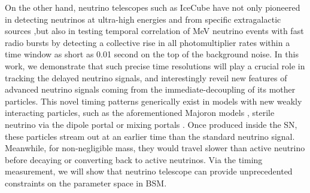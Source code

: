 On the other hand, neutrino telescopes such as IceCube have not only pioneered in detecting neutrinos at ultra-high energies \cite{IceCube:2014stg,IceCube:2018cha} and from specific extragalactic sources \cite{IceCube:2023ame,IceCube:2022der},but also in testing temporal correlation of MeV neutrino events with fast radio bursts \cite{IceCube:2019acm} by detecting a collective rise in all photomultiplier rates within a time window as short as 0.01 second on the top of the background noise. In this work, we demonstrate that such precise time resolutions will play a crucial role in tracking the delayed neutrino signals, and interestingly reveil new features of advanced neutrino signals coming from the immediate-decoupling of its mother particles. This novel timing patterns generically exist in models with new weakly interacting particles, such as the aforementioned Majoron models \cite{Fiorillo:2022cdq}, sterile neutrino via the dipole portal \cite{Magill:2018jla,Brdar:2020quo,Brdar:2023tmi} or mixing portals \cite{Arg_elles_2019, Suliga_2020}. Once produced inside the SN, these particles stream out at an earlier time than the standard neutrino signal. Meanwhile, for non-negligible mass, they would travel slower than active neutrino before decaying or converting back to active neutrinos. Via the timing measurement, we will show that neutrino telescope can provide unprecedented constraints on the parameter space in BSM.\\ 